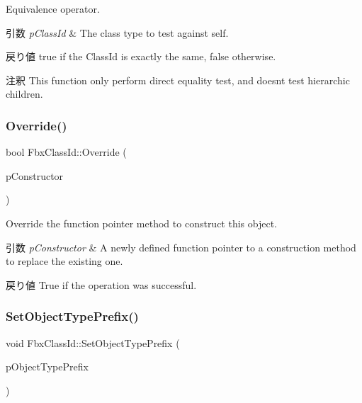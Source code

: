 Equivalence operator. 
\begin{DoxyParams}{引数}
{\em p\+Class\+Id} & The class type to test against self. \\
\hline
\end{DoxyParams}
\begin{DoxyReturn}{戻り値}
{\ttfamily true} if the Class\+Id is exactly the same, {\ttfamily false} otherwise. 
\end{DoxyReturn}
\begin{DoxyRemark}{注釈}
This function only perform direct equality test, and doesn\textquotesingle{}t test hierarchic children. 
\end{DoxyRemark}
\mbox{\label{class_fbx_class_id_ac73f4b211d566fac0f811e6616c79979}} 
\subsubsection{\texorpdfstring{Override()}{Override()}}
{\footnotesize\ttfamily bool Fbx\+Class\+Id\+::\+Override (\begin{DoxyParamCaption}\item[{\hyperlink{fbxclassid_8h_a12707e967b73358bdb4956b72e5aa449}{Fbx\+Object\+Create\+Proc}}]{p\+Constructor }\end{DoxyParamCaption})}

Override the function pointer method to construct this object. 
\begin{DoxyParams}{引数}
{\em p\+Constructor} & A newly defined function pointer to a construction method to replace the existing one. \\
\hline
\end{DoxyParams}
\begin{DoxyReturn}{戻り値}
True if the operation was successful. 
\end{DoxyReturn}
\mbox{\label{class_fbx_class_id_aa62f8547a3ed3a2c3c7f1ea88b392d8c}} 
\subsubsection{\texorpdfstring{Set\+Object\+Type\+Prefix()}{SetObjectTypePrefix()}}
{\footnotesize\ttfamily void Fbx\+Class\+Id\+::\+Set\+Object\+Type\+Prefix (\begin{DoxyParamCaption}\item[{const char $\ast$}]{p\+Object\+Type\+Prefix }\end{DoxyParamCaption})}

